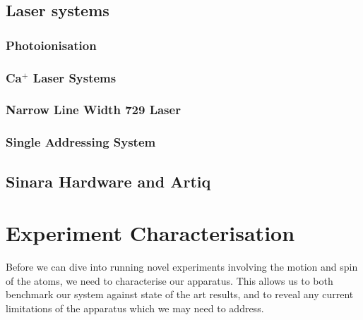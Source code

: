 \documentclass[12pt]{report}
\begin{document}
\section{Laser systems}
\label{sec:Laser systems}
\subsection{Photoionisation}
\subsection{Ca$^+$ Laser Systems}	
\label{sec:Ca+ Laser Systems}


\subsection{Narrow Line Width 729 Laser}
\label{sec:Narrow Line Width 729 Laser} 

\subsection{Single Addressing System}
\label{sec:Single Addressing System}

\section{Sinara Hardware and Artiq}
\label{sec:Sinara Hardware}



\chapter{Experiment Characterisation}

Before we can dive into running novel experiments involving the motion and spin
of the atoms, we need to characterise our apparatus. This allows us to both
benchmark our system against state of the art results, and to reveal any
current limitations of the apparatus which we may need to address.
\end{document}
